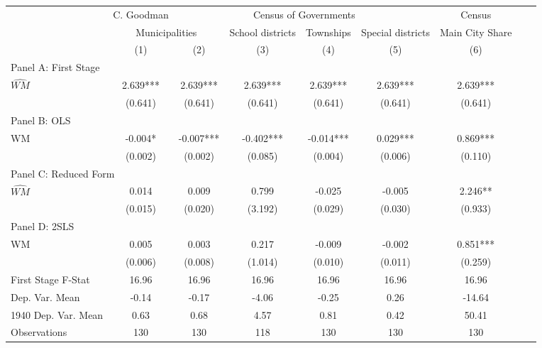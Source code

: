  \begin{tabular}{l*{8}{c}} \toprule
&\multicolumn{1}{c}{C. Goodman}&\multicolumn{4}{c}{Census of Governments}&\multicolumn{1}{c}{Census}\\\cmidrule(lr){2-2}\cmidrule(lr){3-6}\cmidrule(lr){7-7}
&\multicolumn{2}{c}{Municipalities}&\multicolumn{1}{c}{School districts}&\multicolumn{1}{c}{Townships}&\multicolumn{1}{c}{Special districts}&\multicolumn{1}{c}{Main City Share}\\\cmidrule(lr){2-3}\cmidrule(lr){4-6}\cmidrule(lr){7-7}
&\multicolumn{1}{c}{(1)}&\multicolumn{1}{c}{(2)}&\multicolumn{1}{c}{(3)}&\multicolumn{1}{c}{(4)}&\multicolumn{1}{c}{(5)}&\multicolumn{1}{c}{(6)}\\
\cmidrule(lr){1-7}
\multicolumn{6}{l}{Panel A: First Stage}\\
\cmidrule(lr){1-7}
$\widehat{WM}$  &    2.639***&    2.639***&    2.639***&    2.639***&    2.639***&    2.639***\\
                &  (0.641)   &  (0.641)   &  (0.641)   &  (0.641)   &  (0.641)   &  (0.641)   \\
\cmidrule(lr){1-7}
\multicolumn{6}{l}{Panel B: OLS}\\
\cmidrule(lr){1-7}
WM              &   -0.004*  &   -0.007***&   -0.402***&   -0.014***&    0.029***&    0.869***\\
                &  (0.002)   &  (0.002)   &  (0.085)   &  (0.004)   &  (0.006)   &  (0.110)   \\
\cmidrule(lr){1-7}
\multicolumn{6}{l}{Panel C: Reduced Form}\\
\cmidrule(lr){1-7}
$\widehat{WM}$  &    0.014   &    0.009   &    0.799   &   -0.025   &   -0.005   &    2.246** \\
                &  (0.015)   &  (0.020)   &  (3.192)   &  (0.029)   &  (0.030)   &  (0.933)   \\
\cmidrule(lr){1-7}
\multicolumn{6}{l}{Panel D: 2SLS}\\
\cmidrule(lr){1-7}
WM              &    0.005   &    0.003   &    0.217   &   -0.009   &   -0.002   &    0.851***\\
                &  (0.006)   &  (0.008)   &  (1.014)   &  (0.010)   &  (0.011)   &  (0.259)   \\
\midrule
First Stage F-Stat&    16.96   &    16.96   &    16.96   &    16.96   &    16.96   &    16.96   \\
Dep. Var. Mean  &    -0.14   &    -0.17   &    -4.06   &    -0.25   &     0.26   &   -14.64   \\
1940 Dep. Var. Mean&     0.63   &     0.68   &     4.57   &     0.81   &     0.42   &    50.41   \\
Observations    &      130   &      130   &      118   &      130   &      130   &      130   \\
       \bottomrule \end{tabular}
